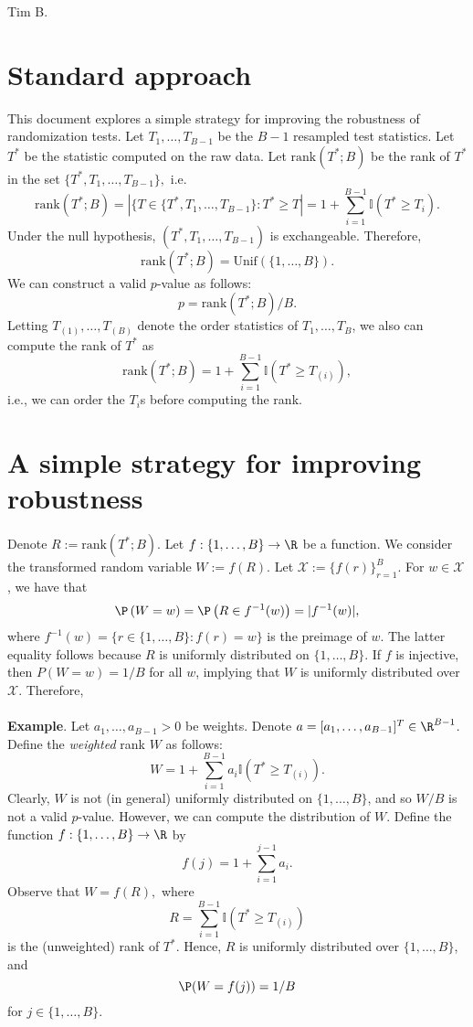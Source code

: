 \documentclass[12pt]{article}
\begin{document}
\noindent Tim B.
\section{Standard approach}
This document explores a simple strategy for improving the robustness of randomization tests. Let $T_1, \dots, T_{B-1}$ be the $B-1$ resampled test statistics. Let $T^*$ be the statistic computed on the raw data. Let $\textrm{rank}(T^*; B)$ be the rank of $T^*$ in the set $\{T^*, T_1, \dots, T_{B-1}\},$
i.e.
$$ \textrm{rank}(T^*; B) = | \{ T \in \{ T^*, T_1, \dots, T_{B-1} \} : T^* \geq T |  = 1 + \sum_{i=1}^{B-1} \mathbb{I}(T^* \geq T_i).$$
Under the null hypothesis, $(T^*, T_1, \dots, T_{B-1})$ is exchangeable. Therefore,
$$\textrm{rank}(T^*; B) = \textrm{Unif}(\{1, \dots, {B}\}).$$
We can construct a valid $p$-value as follows:
$$p = \textrm{rank}(T^*; B)/B.$$ Letting $T_{(1)}, \dots, T_{(B)}$ denote the order statistics of $T_1, \dots, T_B$, we also can compute the rank of $T^*$ as
$$ \textrm{rank}(T^*; B) = 1 + \sum_{i=1}^{B-1} \mathbb{I}(T^* \geq T_{(i)}),$$ i.e., we can order the $T_i$s before computing the rank.

\section{A simple strategy for improving robustness}
Denote $R := \textrm{rank}(T^*; B)$. Let $f: \{1, \dots, B\} \to \R$ be a function. We consider the transformed random variable $W := f(R)$. Let $\mathcal{X} := \{ f(r) \}_{r=1}^B .$ For $w \in \mathcal{X} $, we have that
$$\P\left(W = w\right) = \P\left( R \in f^{-1}(w) \right) = | f^{-1}(w)|,$$
where $f^{-1}(w) = \{ r \in \{1, \dots, B\} : f(r) = w \}$ is the preimage of $w$. The latter equality follows because $R$ is uniformly distributed on $\{1, \dots, B\}.$ If $f$ is injective, then $P(W = w) = 1/B$ for all $w$, implying that $W$ is uniformly distributed over $\mathcal{X}.$ Therefore,  
\\ \\ \noindent
\textbf{Example}. Let $a_1, \dots, a_{B-1} > 0$ be weights. Denote $a = [a_1, \dots, a_{B-1}]^T \in \R^{B-1}$. Define the \textit{weighted} rank $W$ as follows:
$$W = 1 + \sum_{i=1}^{B-1} a_i \mathbb{I}\left( T^* \geq T_{(i)} \right).$$ Clearly, $W$ is not (in general) uniformly distributed on $\{1, \dots, B\}$, and so $W/B$ is not a valid $p$-value. However, we can compute the distribution of $W$. Define the function $f : \{1, \dots, B\} \to \R$ by $$f(j) = 1 + \sum_{i=1}^{j-1} a_i.$$ Observe that $W = f(R),$ where $$R = \sum_{i=1}^{B-1} \mathbb{I}(T^* \geq T_{(i)})$$ is the (unweighted) rank of $T^*$. Hence, $R$ is uniformly distributed over $\{1, \dots, B\}$, and
$$\P(W = f(j)) = 1/B $$ for $j \in \{1, \dots, B\}.$ 

 


\end{document}
